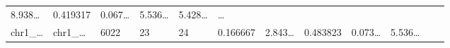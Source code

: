 \documentclass[
]{article}
\begin{document}
\begin{longtable}[]{@{}llllllllllll@{}}
\begin{minipage}[t]{0.08\columnwidth}
8.938\ldots{}\strut
\end{minipage} & \begin{minipage}[t]{0.06\columnwidth}\raggedright
0.419317\strut
\end{minipage} & \begin{minipage}[t]{0.06\columnwidth}\raggedright
0.067\ldots{}\strut
\end{minipage} & \begin{minipage}[t]{0.09\columnwidth}\raggedright
5.536\ldots{}\strut
\end{minipage} & \begin{minipage}[t]{0.06\columnwidth}\raggedright
5.428\ldots{}\strut
\end{minipage} & \begin{minipage}[t]{0.02\columnwidth}\raggedright
\ldots{}\strut
\end{minipage}\tabularnewline
\begin{minipage}[t]{0.06\columnwidth}\raggedright
chr1\_\ldots{}\strut
\end{minipage} & \begin{minipage}[t]{0.06\columnwidth}\raggedright
chr1\_\ldots{}\strut
\end{minipage} & \begin{minipage}[t]{0.06\columnwidth}\raggedright
6022\strut
\end{minipage} & \begin{minipage}[t]{0.06\columnwidth}\raggedright
23\strut
\end{minipage} & \begin{minipage}[t]{0.06\columnwidth}\raggedright
24\strut
\end{minipage} & \begin{minipage}[t]{0.06\columnwidth}\raggedright
0.166667\strut
\end{minipage} & \begin{minipage}[t]{0.08\columnwidth}\raggedright
2.843\ldots{}\strut
\end{minipage} & \begin{minipage}[t]{0.06\columnwidth}\raggedright
0.483823\strut
\end{minipage} & \begin{minipage}[t]{0.06\columnwidth}\raggedright
0.073\ldots{}\strut
\end{minipage} & \begin{minipage}[t]{0.09\columnwidth}\raggedright
5.536\ldots{}\strut
\end{minipage} & \begin{minipage}[t]{0.06\columnwidth}\raggedright

\end{minipage}
\end{longtable}
\end{document}
